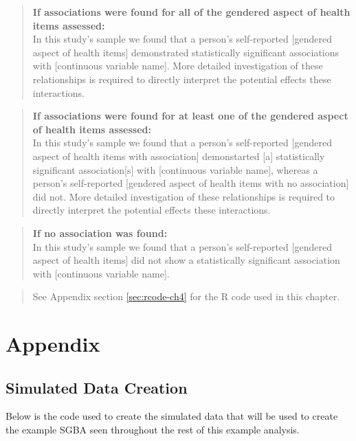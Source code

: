 \documentclass[
]{book}
\begin{document}
\begin{quote}
\textbf{If associations were found for all of the gendered aspect of health items assessed:}\\
In this study's sample we found that a person's self-reported {[}gendered aspect of health items{]} demonstrated statistically significant associations with {[}continuous variable name{]}. More detailed investigation of these relationships is required to directly interpret the potential effects these interactions.
\end{quote}

\begin{quote}
\textbf{If associations were found for at least one of the gendered aspect of health items assessed:}\\
In this study's sample we found that a person's self-reported {[}gendered aspect of health items with association{]} demonstarted {[}a{]} statistically significant association{[}s{]} with {[}continuous variable name{]}, whereas a person's self-reported {[}gendered aspect of health items with no association{]} did not. More detailed investigation of these relationships is required to directly interpret the potential effects these interactions.
\end{quote}

\begin{quote}
\textbf{If no association was found:}\\
In this study's sample we found that a person's self-reported {[}gendered aspect of health items{]} did not show a statistically significant association with {[}continuous variable name{]}.
\end{quote}

\begin{quote}
See Appendix section \ref{sec:rcode-ch4} for the R code used in this chapter.
\end{quote}

\chapter{Appendix}\label{appendix}

\section{Simulated Data Creation}\label{sec:sim-data}

Below is the code used to create the simulated data that will be used to create the example SGBA seen throughout the rest of this example analysis.
\end{document}
